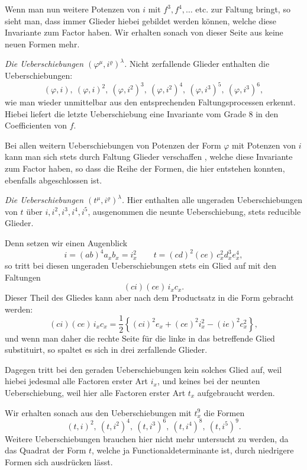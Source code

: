 Wenn man nun weitere Potenzen von $i$ mit $f^3, f^4, \ldots$ etc. zur
Faltung bringt, so sieht man, dass immer Glieder hiebei gebildet
werden k\"onnen, welche diese Invariante zum Factor haben. Wir erhalten
 sonach von dieser Seite aus keine neuen Formen mehr.

\textit{Die Ueberschiebungen $(\varphi^\mu, i^\varrho)^\lambda$.} Nicht zerfallende Glieder enthalten
 die Ueberschiebungen:
\[
(\varphi, i),\ (\varphi, i)^2,\ (\varphi, i^2)^3,\ (\varphi, i^2)^4,\ (\varphi, i^3)^5,\ (\varphi, i^3)^6,
\]
wie man wieder unmittelbar aus den entsprechenden Faltungsprocessen
erkennt. Hiebei liefert die letzte Ueberschiebung eine Invariante vom
Grade 8 in den Coefficienten von $f$.

Bei allen weitern Ueberschiebungen von Potenzen der Form $\varphi$
mit Potenzen von $i$ kann man sich stets durch Faltung Glieder verschaffen
, welche diese Invariante zum Factor haben, so dass die Reihe
der Formen, die hier entstehen konnten, ebenfalls abgeschlossen ist.

\textit{Die Ueberschiebungen $(t^\mu, i^\varrho)^\lambda$.} Hier enthalten alle ungeraden
Ueberschiebungen von $t$ \"uber $i, i^2, i^3, i^4, i^5$, ausgenommen die neunte
Ueberschiebung, stets reducible Glieder.

Denn setzen wir einen Augenblick
\[
i = (ab)^4 a_x b_x = i_x^2 \qquad
t = (cd)^2 (ce)\, c_x^2 d_x^3 e_x^4,
\]
so tritt bei diesen ungeraden Ueberschiebungen stets ein Glied auf
mit den Faltungen
\[
(ci)(ce)\, i_x c_x.
\]
Dieser Theil des Gliedes kann aber nach dem Productsatz in die
Form gebracht werden:
\[
(ci)(ce)\, i_x c_x = \frac{1}{2} \left\{ (ci)^2 e_x + (ce)^2 i_x^2 - (ie)^2 c_x^2 \right\},
\]
und wenn man daher die rechte Seite f\"ur die linke in das betreffende
Glied substituirt, so spaltet es sich in drei zerfallende Glieder.


Dagegen tritt bei den geraden Ueberschiebungen kein solches
Glied auf, weil hiebei jedesmal alle Factoren erster Art $i_x$, und
keines bei der neunten Ueberschiebung, weil hier alle Factoren erster
Art $t_x$ aufgebraucht werden.

Wir erhalten sonach aus den Ueberschiebungen mit $t_x^9$ die Formen
\[
(t, i)^2,\ (t, i^2)^4,\ (t, i^3)^6,\ (t, i^4)^8,\ (t, i^5)^9.
\]
Weitere Ueberschiebungen brauchen hier nicht mehr untersucht
zu werden, da das Quadrat der Form $t$, welche ja Functionaldeterminante
 ist, durch niedrigere Formen sich ausdr\"ucken l\"asst.

